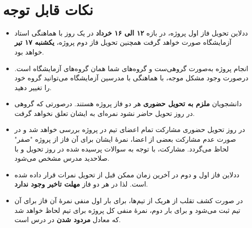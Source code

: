 \documentclass[]{article}
\begin{document}
\newpage
\pagestyle{fancy}
\fancyhf{}
\fancyfoot{}
\cfoot{\thepage}
\renewcommand{\headrulewidth}{2pt}



\tableofcontents

\newpage

 \Large \textbf{\\
}

\section*{{\titr نکات قابل توجه}}
\begin{itemize}
	
\item 
ددلاین تحویل فاز اول پروژه، در بازه \textbf{۱۲ الی ۱۶ خرداد} در یک روز با هماهنگی استاد آزمایشگاه صورت خواهد گرفت همچنین تحویل فاز دوم پروژه، \textbf{یکشنبه ۱۷ تیر} خواهد بود.
	
\item
انجام پروژه به‌صورت گروهی‌ست و گروه‌های شما همان گروه‌های آزمایشگاه است. درصورت وجود مشکل موجه، با هماهنگی با مدرسین آزمایشگاه می‌توانید گروه خود را تغییر دهید.


\item
دانشجویان \textbf{ملزم به تحویل حضوری} هر دو فاز پروژه هستند. درصورتی که گروهی در روز تحویل حاضر نشود نمره‌ای به ایشان تعلق نخواهد گرفت.

\item
در روز تحویل حضوری مشارکت تمام اعضای تیم در پروژه بررسی خواهد‌ شد و در صورت عدم مشارکت بعضی از اعضا، نمرهٔ ایشان برای آن فاز از پروژه "صفر" لحاظ می‌گردد. مشارکت، با توجه به سوالات پرسیده شده در روز تحویل و با صلاحدید مدرس مشخص می‌شود.

\item
ددلاین فاز اول و دوم در آخرین زمان ممکن قبل از تحویل نمرات قرار داده شده است. لذا در هر دو فاز \textbf{مهلت تاخیر وجود ندارد}.

\item
در صورت کشف تقلب از هریک از تیم‌ها، برای بار اول منفی نمرهٔ آن فاز برای آن تیم ثبت می‌شود و برای بار دوم، نمرهٔ منفی کل پروژه برای تیم لحاظ خواهد‌ شد که معادل \textbf{مردود شدن} در درس است.
\end{itemize}
\end{document}
